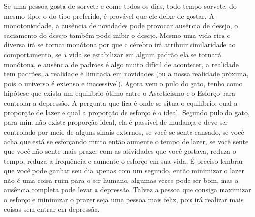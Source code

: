 \documentclass[10pt,a4paper]{report}
\begin{document}
Se uma pessoa gosta de sorvete e come todos os dias, todo tempo sorvete, do mesmo tipo, o do tipo preferido, é provável que ele deixe de gostar. A monotonicidade, a ausência de novidades pode provocar ausência de desejo, o saciamento do desejo também pode inibir o desejo. Mesmo uma vida rica e diversa irá se tornar monótona por que o cérebro irá atribuir similaridade ao comportamento, se a vida se estabilizar em algum padrão ela se tornará monótona, e ausência de padrões é algo muito difícil de acontecer, a realidade tem padrões, a realidade é limitada em novidades (ou a nossa realidade próxima, pois o universo é extenso e inacessível). 
Agora vem o pulo do gato, tenho como hipótese que exista um equilíbrio ótimo entre o Asceticismo e o Esforço para controlar a depressão. A pergunta que fica é onde se situa o equilíbrio, qual a proporção de lazer e qual a proporção de esforço é o ideal. Segundo pulo do gato, para mim não existe proporção ideal, ela é passível de mudança e deve ser controlado por meio de alguns sinais externos, se você se sente cansado, se você acha que está se esforçando muito então aumente o tempo de lazer, se você sente que você não sente mais prazer com as atividades que você gostava, reduza o tempo, reduza a frequência e aumente o esforço em sua vida. É preciso lembrar que você pode ganhar seu dia apenas com um segundo, então minimizar o lazer não é uma coisa ruim para o ser humano, algumas vezes pode ser bom, mas a ausência completa pode levar a depressão. Talvez a pessoa que consiga maximizar o esforço e minimizar o prazer seja uma pessoa mais feliz, pois irá realizar mais coisas sem entrar em depressão.\\

\end{document}
